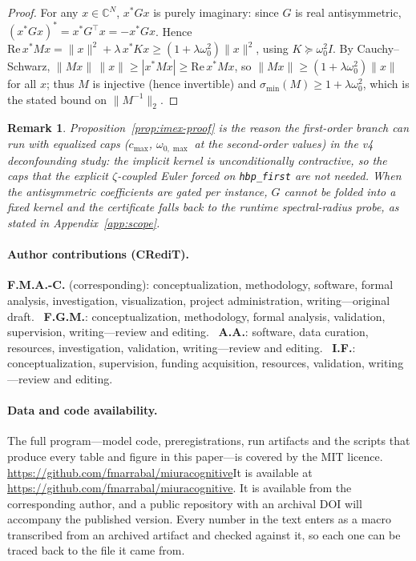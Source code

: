 \documentclass{article}
\newif\ifanon
\newtheorem{remark}{Remark}
\newcommand{\coderepo}{\url{https://github.com/fmarrabal/miuracognitive}}
\begin{document}
{\begin{proof}
For any $x\in\mathbb{C}^N$, $x^*Gx$ is purely imaginary: since $G$ is
real antisymmetric, $(x^*Gx)^* = x^*G^\top x = -x^*Gx$. Hence
$\mathrm{Re}\,x^*Mx = \|x\|^2 + \lambda\,x^*Kx \ge
(1+\lambda\omega_0^2)\|x\|^2$, using $K\succeq\omega_0^2 I$. By
Cauchy--Schwarz, $\|Mx\|\,\|x\| \ge |x^*Mx| \ge \mathrm{Re}\,x^*Mx$, so
$\|Mx\| \ge (1+\lambda\omega_0^2)\|x\|$ for all $x$; thus $M$ is
injective (hence invertible) and $\sigma_{\min}(M)\ge
1+\lambda\omega_0^2$, which is the stated bound on $\|M^{-1}\|_2$.
\end{proof}

\begin{remark}
Proposition~\ref{prop:imex-proof} is the reason the first-order branch can run
with equalized caps ($c_{\max}$, $\omega_{0,\max}$ at the second-order
values) in the v4 deconfounding study: the implicit kernel is
unconditionally contractive, so the caps that the explicit
$\zeta$-coupled Euler forced on \texttt{hbp\_first} are not needed.
When the antisymmetric coefficients are \emph{gated} per instance, $G$
cannot be folded into a fixed kernel and the certificate falls back to
the runtime spectral-radius probe, as stated in
Appendix~\ref{app:scope}.
\end{remark}


\paragraph{Author contributions (CRediT).} \ifanon Withheld for double-blind review. \else
\textbf{F.M.A.-C.} (corresponding): conceptualization, methodology, software,
formal analysis, investigation, visualization, project administration,
writing---original draft. \ 
\textbf{F.G.M.}: conceptualization, methodology, formal analysis, validation,
supervision, writing---review and editing. \ 
\textbf{A.A.}: software, data curation, resources, investigation, validation,
writing---review and editing. \ 
\textbf{I.F.}: conceptualization, supervision, funding acquisition, resources,
validation, writing---review and editing. \fi

\paragraph{Data and code availability.} The full program---model code,
preregistrations, run artifacts and the scripts that produce every table and
figure in this paper---is covered by the MIT licence.
\ifanon The repository is withheld here for double-blind review; its URL and
an archival DOI will be given in the camera-ready version.
\else\ifdefined\coderepo It is available at \coderepo.
\else It is available from the corresponding author, and a public repository
with an archival DOI will accompany the published version.\fi\fi
Every number in the text enters as a macro transcribed from an archived
artifact and checked against it, so each one can be traced back to the file it
came from.

}
\end{document}
